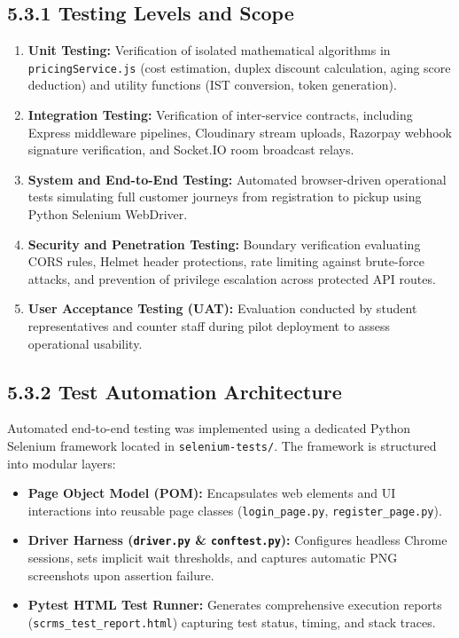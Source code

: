 \documentclass[12pt,a4paper,oneside]{report}
\begin{document}
\subsection{5.3.1 Testing Levels and Scope}
\begin{enumerate}[leftmargin=0.35in, itemsep=2pt]
  \item \textbf{Unit Testing:} Verification of isolated mathematical algorithms in \texttt{pricingService.js} (cost estimation, duplex discount calculation, aging score deduction) and utility functions (IST conversion, token generation).
  \item \textbf{Integration Testing:} Verification of inter-service contracts, including Express middleware pipelines, Cloudinary stream uploads, Razorpay webhook signature verification, and Socket.IO room broadcast relays.
  \item \textbf{System and End-to-End Testing:} Automated browser-driven operational tests simulating full customer journeys from registration to pickup using Python Selenium WebDriver.
  \item \textbf{Security and Penetration Testing:} Boundary verification evaluating CORS rules, Helmet header protections, rate limiting against brute-force attacks, and prevention of privilege escalation across protected API routes.
  \item \textbf{User Acceptance Testing (UAT):} Evaluation conducted by student representatives and counter staff during pilot deployment to assess operational usability.
\end{enumerate}

\subsection{5.3.2 Test Automation Architecture}
Automated end-to-end testing was implemented using a dedicated Python Selenium framework located in \texttt{selenium-tests/}. The framework is structured into modular layers:
\begin{itemize}[leftmargin=0.35in, itemsep=2pt]
  \item \textbf{Page Object Model (POM):} Encapsulates web elements and UI interactions into reusable page classes (\texttt{login\_page.py}, \texttt{register\_page.py}).
  \item \textbf{Driver Harness (\texttt{driver.py} \& \texttt{conftest.py}):} Configures headless Chrome sessions, sets implicit wait thresholds, and captures automatic PNG screenshots upon assertion failure.
  \item \textbf{Pytest HTML Test Runner:} Generates comprehensive execution reports (\texttt{scrms\_test\_report.html}) capturing test status, timing, and stack traces.
\end{itemize}
\end{document}
